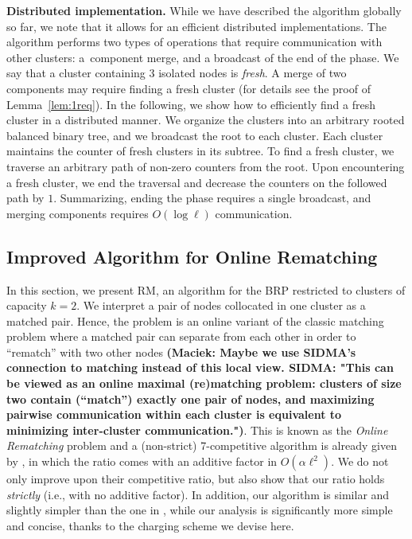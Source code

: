 \documentclass[a4paper,anonymous,USenglish]{lipics-v2019}
\newcommand{\OBRP}{BRP\xspace}
\newcommand{\RM}{\textsc{RM}\xspace} %
\newcommand\maciek[1]{\color{brown}\textbf{(Maciek: #1)}\color{black}}
\begin{document}
\medskip
\noindent
\textbf{Distributed implementation.}
While we have described the algorithm globally so far, we note that it allows for an efficient distributed implementations. 
The algorithm performs two types of operations that require communication with other clusters: a~component merge, and a broadcast of the end of the phase.
We say that a cluster containing $3$ isolated nodes is \emph{fresh}.
A merge of two components may require finding a fresh cluster (for details see the proof of Lemma~\ref{lem:1req}).
In the following, we show how to efficiently find a fresh cluster in a distributed manner.
We organize the clusters into an arbitrary rooted balanced binary tree, and we broadcast the root to each cluster.
Each cluster maintains the counter of fresh clusters in its subtree.
To find a fresh cluster, we traverse an arbitrary path of non-zero counters from the root.
Upon encountering a fresh cluster, we end the traversal and decrease the counters on the followed path by $1$.
Summarizing, ending the phase requires a single broadcast, and merging components requires $O(\log \ell)$ communication.

\subsection{Improved Algorithm for Online Rematching} \label{sec:k2}
In this section,
we present \RM,
 an algorithm for the \OBRP restricted to clusters of capacity $k=2$.
We interpret a pair of nodes collocated in one cluster as a matched pair.
Hence,
the problem is an online variant of the classic matching problem where
a matched pair can separate from each other in order to ``rematch'' with two other nodes
\maciek{Maybe we use SIDMA's connection to matching instead of this local view. SIDMA: "This can be viewed as an online maximal (re)matching problem: clusters of size two contain (“match”) exactly one pair of nodes, and maximizing pairwise communication within each cluster is equivalent to minimizing inter-cluster communication."}.
This is known as the  \emph{Online Rematching} 
problem and a (non-strict) 7-competitive algorithm is already given by \cite{repartition-disc},
in which the ratio comes with an additive factor in $O(\alpha\ell^2)$.
We do not only improve upon their competitive ratio,
but also show that our ratio holds \emph{strictly}
(i.e., with no additive factor).
In addition,
our algorithm is similar
and slightly simpler than the one in \cite{repartition-disc}, 
while our analysis is significantly more simple and concise,
thanks to the charging scheme we devise here.
\end{document}
